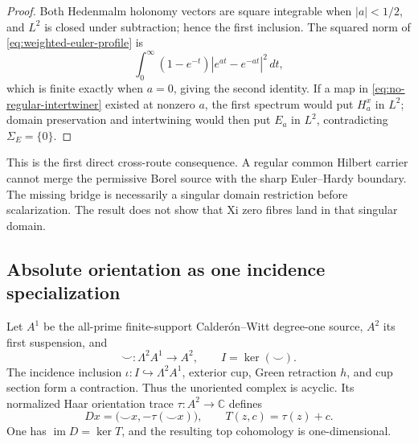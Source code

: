 \documentclass[11pt]{article}
\theoremstyle{definition}
\theoremstyle{remark}
\newcommand{\C}{\mathbb C}
\begin{document}
\begin{proof}
Both Hedenmalm holonomy vectors are square integrable when \(|a|<1/2\),
and \(L^2\) is closed under subtraction; hence the first inclusion.  The
squared norm of \eqref{eq:weighted-euler-profile} is
\[
 \int_0^\infty(1-e^{-t})|e^{at}-e^{-at}|^2\,dt,
\]
which is finite exactly when \(a=0\), giving the second identity.  If a
map in \eqref{eq:no-regular-intertwiner} existed at nonzero \(a\), the
first spectrum would put \(H_a^x\) in \(L^2\); domain preservation and
intertwining would then put \(E_a\) in \(L^2\), contradicting
\(\Sigma_E=\{0\}\).
\end{proof}

This is the first direct cross-route consequence.  A regular common
Hilbert carrier cannot merge the permissive Borel source with the sharp
Euler--Hardy boundary.  The missing bridge is necessarily a singular
domain restriction before scalarization.  The result does not show that
Xi zero fibres land in that singular domain.

\subsection{Absolute orientation as one incidence specialization}

Let \(A^1\) be the all-prime finite-support Calder\'on--Witt degree-one
source, \(A^2\) its first suspension, and
\[
 \smile:\Lambda^2A^1\longrightarrow A^2,\qquad
 I=\ker(\smile).
\]
The incidence inclusion \(\iota:I\hookrightarrow\Lambda^2A^1\), exterior
cup, Green retraction \(h\), and cup section form a contraction.  Thus the
unoriented complex is acyclic.  Its normalized Haar orientation trace
\(\tau:A^2\to\C\) defines
\[
 D x=\bigl(\smile x,-\tau(\smile x)\bigr),\qquad
 T(z,c)=\tau(z)+c .
\tag{5.1}\label{eq:oriented-complex}
\]
One has \(\operatorname{im}D=\ker T\), and the resulting top cohomology is
one-dimensional.
\end{document}
